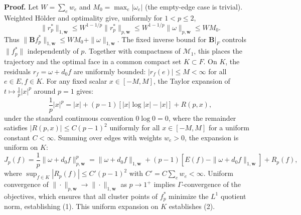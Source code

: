 \documentclass[
]{article}
\begin{document}
\textbf{Proof.} Let \(W=\sum_e w_e\) and \(M_0=\max_e|\omega_e|\) (the empty-edge case is trivial). Weighted Hölder and optimality give, uniformly for \(1<p\le2\),
\[\|r_p^*\|_{1,\mathbf{w}}\le W^{1-1/p}\|r_p^*\|_{p,\mathbf{w}}
\le W^{1-1/p}\|\omega\|_{p,\mathbf{w}}\le WM_0.\]
Thus \(\|\mathbf{B}f_p^*\|_{1,\mathbf{w}}\le WM_0+\|\omega\|_{1,\mathbf{w}}\). The fixed inverse bound for \(\mathbf{B}|_F\) controls \(\|f_p^*\|\) independently of \(p\). Together with compactness of \(\mathcal{M}_1\), this places the trajectory and the optimal face in a common compact set \(K\subset F\). On \(K\), the residuals \(r_f = \omega + d_0 f\) are uniformly bounded: \(|r_f(e)| \le M < \infty\) for all \(e \in E, f \in K\).
For any fixed scalar \(x \in [-M, M]\), the Taylor expansion of \(t \mapsto \frac{1}{p} |x|^p\) around \(p = 1\) gives:
\[\frac{1}{p} |x|^p = |x| + (p - 1)\left[|x| \log |x| - |x|\right] + R(p, x),\]
under the standard continuous convention \(0 \log 0 = 0\), where the remainder satisfies \(|R(p, x)| \le C (p-1)^2\) uniformly for all \(x \in [-M, M]\) for a uniform constant \(C < \infty\). Summing over edges with weights \(w_e > 0\), the expansion is uniform on \(K\):
\[J_p(f) = \frac{1}{p} \|\omega + d_0 f\|_{p, \mathbf{w}}^p = \|\omega + d_0 f\|_{1, \mathbf{w}} + (p - 1)\left[E(f) - \|\omega + d_0 f\|_{1, \mathbf{w}}\right] + R_p(f),\]
where \(\sup_{f \in K} |R_p(f)| \le C' (p-1)^2\) with \(C' = C \sum_e w_e < \infty\).
Uniform convergence of \(\|\cdot\|_{p,\mathbf{w}} \to \|\cdot\|_{1,\mathbf{w}}\) as \(p \to 1^+\) implies \(\Gamma\)-convergence of the objectives, which ensures that all cluster points of \(f_p^*\) minimize the \(L^1\) quotient norm, establishing (1).
This uniform expansion on \(K\) establishes (2).
\end{document}

